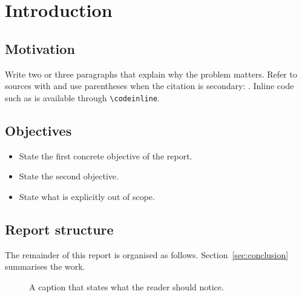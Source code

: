 \section{Introduction}
\label{sec:introduction}

\subsection{Motivation}
Write two or three paragraphs that explain why the problem matters. Refer to
sources with \textcite{sample-article} and use parentheses when the citation is
secondary: \parencite{sample-online}. Inline code such as
 is available through \verb|\codeinline|.

\subsection{Objectives}
\begin{itemize}
    \item State the first concrete objective of the report.
    \item State the second objective.
    \item State what is explicitly out of scope.
\end{itemize}

\subsection{Report structure}
The remainder of this report is organised as follows.
Section~\ref{sec:conclusion} summarises the work.

\begin{figure}[H]
    \centering
    \caption{A caption that states what the reader should notice.}
    \label{fig:placeholder}
\end{figure}


